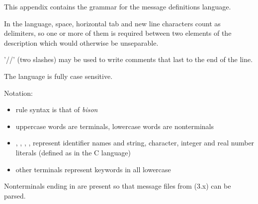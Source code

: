 \label{cha:msg-language-grammar}

This appendix contains the grammar for the message definitions
language.

In the language, space, horizontal tab and new line characters count
as delimiters, so one or more of them is required between two elements of the
description which would otherwise be unseparable.

'//' (two slashes) may be used to write comments that last to the end of the line.

The language is fully case sensitive.

Notation:
\begin{itemize}
  \item rule syntax is that of \textit{bison}
  \item uppercase words are terminals, lowercase words are nonterminals
  \item {}, , , ,
         represent identifier names and string, character,
        integer and real number literals (defined as in the C language)
  \item other terminals represent keywords in all lowercase
\end{itemize}

Nonterminals ending in  are present so that message files
from {\opp} (3.x) can be parsed.

%
%
%

